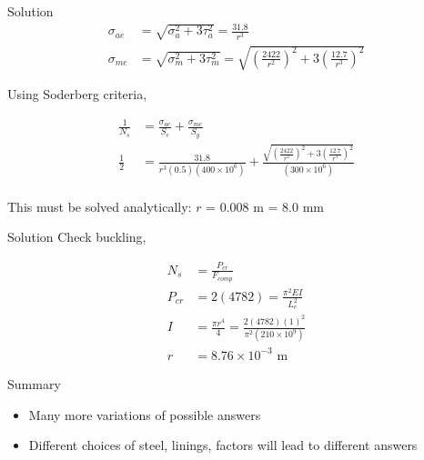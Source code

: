 \documentclass[10pt, svgnames]{beamer}
\begin{document}
\begin{frame}[label={sec:org20cc5e5}]{Solution}
\begin{align*}
  \sigma_{ae} &= \sqrt{\sigma_{a}^{2} + 3 \tau_{a}^{2}} = \frac{31.8}{r^{3}} \\
  \sigma_{me} &= \sqrt{\sigma_{m}^{2} + 3 \tau_{m}^{2}} = \sqrt{\left(\frac{2422}{r^2}\right)^2 + 3 \left(\frac{12.7}{r^{3}} \right)^2}
\end{align*}

Using Soderberg criteria,

\begin{align*}
  \frac{1}{N_{s}} &= \frac{\sigma_{ae}}{S_{e}} + \frac{\sigma_{me}}{S_{y}} \\
  \frac{1}{2} &= \frac{31.8}{r^{3}(0.5)(400 \times 10^{6})} + \frac{\sqrt{\left(\frac{2422}{r^2}\right)^2 + 3 \left(\frac{12.7}{r^{3}} \right)^2}}{(300 \times 10^{6})} \\
\end{align*}

This must be solved analytically: \(r\) = 0.008 m = 8.0 mm
\end{frame}

\begin{frame}[label={sec:orgfc8365b}]{Solution}
Check buckling,

\begin{align*}
  N_s &= \frac{P_{cr}}{F_{comp}} \\
  P_{cr} &= 2(4782) = \frac{\pi^2 E I}{L_e^2} \\
  I &= \frac{\pi r^4}{4} = \frac{2(4782)(1)^2}{\pi^2(210 \times 10^9)} \\
  r &= 8.76 \times 10^{-3} \text{ m}
\end{align*}
\end{frame}

\begin{frame}[label={sec:org9b6f980}]{Summary}
\begin{itemize}
\item Many more variations of possible answers
\item Different choices of steel, linings, factors will lead to different answers
\end{itemize}
\end{frame}
\end{document}

